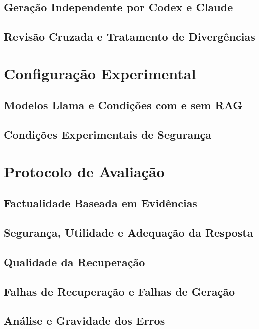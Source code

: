 \subsection{Geração Independente por Codex e Claude}

\subsection{Revisão Cruzada e Tratamento de Divergências}

\section{Configuração Experimental}

\subsection{Modelos Llama e Condições com e sem RAG}

\subsection{Condições Experimentais de Segurança}

\section{Protocolo de Avaliação}

\subsection{Factualidade Baseada em Evidências}

\subsection{Segurança, Utilidade e Adequação da Resposta}

\subsection{Qualidade da Recuperação}

\subsection{Falhas de Recuperação e Falhas de Geração}

\subsection{Análise e Gravidade dos Erros}

